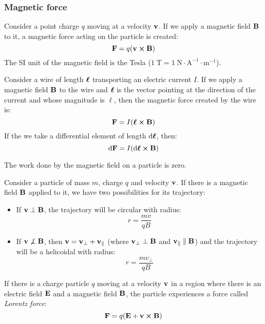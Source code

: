 \documentclass[../../../main_physics.tex]{subfiles}
\begin{document}
\begin{multicols}{2}
  \subsubsection{Magnetic force}
  \begin{proposition}
    Consider a point charge $q$ moving at a velocity $\boldsymbol{\mathrm{v}}$. If we apply a magnetic field $\boldsymbol{\mathrm{B}}$ to it, a magnetic force acting on the particle is created: $$\vf{F}=q(\vf{v}\crossprod\vf{B})$$ The SI unit of the magnetic field is the Tesla ($1\;\text{T}=1\;\text{N}\cdot\text{A}^{-1}\cdot\text{m}^{-1}$).
  \end{proposition}
  \begin{proposition}
    Consider a wire of length $\boldsymbol{\mathrm{\ell}}$ transporting an electric current $I$. If we apply a magnetic field $\boldsymbol{\mathrm{B}}$ to the wire and $\boldsymbol{\mathrm{\ell}}$ is the vector pointing at the direction of the current and whose magnitude is $\ell$, then the magnetic force created by the wire is: $$\vf{F}=I(\vf{\ell}\crossprod\vf{B})$$ If the we take a differential element of length $\dd{\boldsymbol{\mathrm{\ell}}}$, then: $$\dd{\vf{F}}=I(\dd{\vf{\ell}}\crossprod\vf{B})$$
  \end{proposition}
  \begin{lemma}
    The work done by the magnetic field on a particle is zero.
  \end{lemma}
  \begin{proposition}
    Consider a particle of mass $m$, charge $q$ and velocity $\boldsymbol{\mathrm{v}}$. If there is a magnetic field $\boldsymbol{\mathrm{B}}$ applied to it, we have two possibilities for its trajectory:
    \begin{itemize}
      \item If $\boldsymbol{\mathrm{v}}\perp\boldsymbol{\mathrm{B}}$, the trajectory will be circular with radius: $$r=\frac{mv}{qB}$$
      \item If $\boldsymbol{\mathrm{v}}\not\perp\boldsymbol{\mathrm{B}}$, then $\boldsymbol{\mathrm{v}}=\boldsymbol{\mathrm{v}}_\perp+\boldsymbol{\mathrm{v}}_\parallel$ (where $\boldsymbol{\mathrm{v}}_\perp\perp\boldsymbol{\mathrm{B}}$ and $\boldsymbol{\mathrm{v}}_\parallel\parallel\boldsymbol{\mathrm{B}}$) and the trajectory will be a helicoidal with radius: $$r=\frac{mv_\perp}{qB}$$
    \end{itemize}
  \end{proposition}
  \begin{proposition}
    If there is a charge particle $q$ moving at a velocity $\boldsymbol{\mathrm{v}}$ in a region where there is an electric field $\boldsymbol{\mathrm{E}}$ and a magnetic field $\boldsymbol{\mathrm{B}}$, the particle experiences a force called \emph{Lorentz force}: $$\vf{F}=q(\vf{E}+\vf{v}\crossprod\vf{B})$$
  \end{proposition}

\end{multicols}
\end{document}
